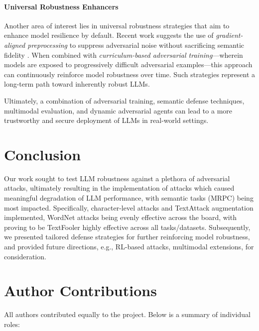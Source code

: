 \documentclass[conference]{IEEEtran}
\begin{document}
\paragraph{Universal Robustness Enhancers}
Another area of interest lies in universal robustness strategies that aim to enhance model resilience by default. Recent work suggests the use of \textit{gradient-aligned preprocessing} to suppress adversarial noise without sacrificing semantic fidelity \cite{omar2022robust}. When combined with \textit{curriculum-based adversarial training}—wherein models are exposed to progressively difficult adversarial examples—this approach can continuously reinforce model robustness over time. Such strategies represent a long-term path toward inherently robust LLMs.

\bigskip
Ultimately, a combination of adversarial training, semantic defense techniques, multimodal evaluation, and dynamic adversarial agents can lead to a more trustworthy and secure deployment of LLMs in real-world settings.

\section{Conclusion}

Our work sought to test LLM robustness against a plethora of adversarial attacks, ultimately resulting in the implementation of attacks which caused meaningful degradation of LLM performance, with semantic tasks (MRPC) being most impacted. Specifically, character-level attacks and TextAttack augmentation implemented, WordNet attacks being evenly effective across the board, with proving to be TextFooler highly effective across all tasks/datasets. Subsequently, we presented tailored defense strategies for further reinforcing model robustness, and provided future directions, e.g., RL-based attacks, multimodal extensions, for consideration.


\section*{Author Contributions}

All authors contributed equally to the project. Below is a summary of individual roles:
\end{document}
